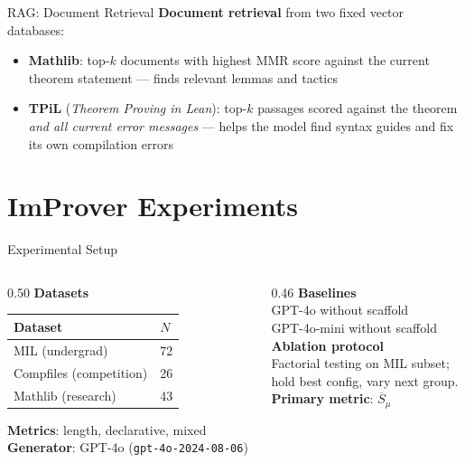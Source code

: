 \documentclass{beamer}
\begin{document}
\begin{frame}{RAG: Document Retrieval}
\vspace{0.8em}
\textbf{Document retrieval} from two fixed vector databases:
\vspace{0.6em}
\begin{itemize}\setlength{\itemsep}{12pt}
  \item \textbf{Mathlib}: top-$k$ documents with highest MMR score against the current theorem statement --- finds relevant lemmas and tactics
  \item \textbf{TPiL} (\emph{Theorem Proving in Lean}): top-$k$ passages scored against the theorem \emph{and all current error messages} --- helps the model find syntax guides and fix its own compilation errors
\end{itemize}
\end{frame}

\section{ImProver Experiments}

\begin{frame}{Experimental Setup}
\vspace{0.4em}
\begin{columns}[T]
\begin{column}{0.50\textwidth}
\textbf{Datasets}\\[0.4em]
\begin{tabular}{ll}
\toprule
\textbf{Dataset} & \textbf{$N$}\\
\midrule
MIL (undergrad) & 72\\
Compfiles (competition) & 26\\
Mathlib (research) & 43\\
\bottomrule
\end{tabular}
\vspace{0.4em}

\textbf{Metrics}: length, declarative, mixed\\[0.3em]
\textbf{Generator}: GPT-4o (\texttt{gpt-4o-2024-08-06})
\end{column}
\begin{column}{0.46\textwidth}
\textbf{Baselines}\\[0.4em]
GPT-4o without scaffold\\
GPT-4o-mini without scaffold\\[0.5em]
\textbf{Ablation protocol}\\[0.4em]
\small Factorial testing on MIL subset;\\
hold best config, vary next group.\\[0.4em]
\textbf{Primary metric}: $\overline{S}_\mu$
\end{column}
\end{columns}
\end{frame}
\end{document}
